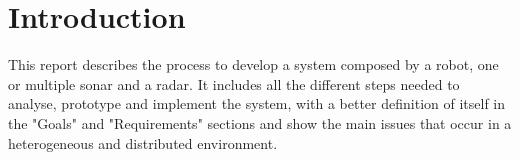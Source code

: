 \section{Introduction}
This report describes the process to develop a system composed by a robot, one or multiple sonar and a radar. It includes all the different steps needed to analyse, prototype and implement the system, with a better definition of itself in the "Goals" and "Requirements" sections and show the main issues that occur in a heterogeneous and distributed environment.